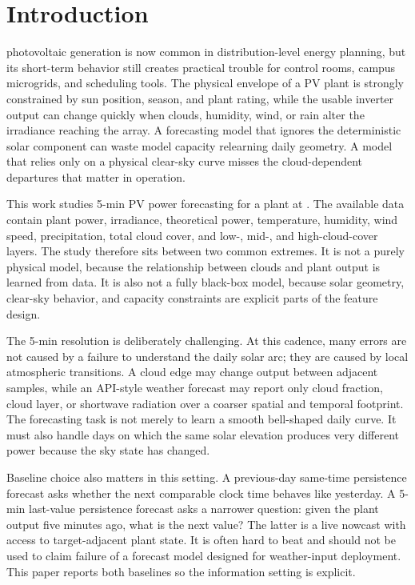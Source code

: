 \section{Introduction}
\label{sec:introduction}

 photovoltaic generation is now common in distribution-level energy planning, but its short-term behavior still creates practical trouble for control rooms, campus microgrids, and scheduling tools. The physical envelope of a PV plant is strongly constrained by sun position, season, and plant rating, while the usable inverter output can change quickly when clouds, humidity, wind, or rain alter the irradiance reaching the array. A forecasting model that ignores the deterministic solar component can waste model capacity relearning daily geometry. A model that relies only on a physical clear-sky curve misses the cloud-dependent departures that matter in operation.

This work studies 5-min PV power forecasting for a \PlantCapacity{} plant at \StudySite. The available data contain plant power, irradiance, theoretical power, temperature, humidity, wind speed, precipitation, total cloud cover, and low-, mid-, and high-cloud-cover layers. The study therefore sits between two common extremes. It is not a purely physical model, because the relationship between clouds and plant output is learned from data. It is also not a fully black-box model, because solar geometry, clear-sky behavior, and capacity constraints are explicit parts of the feature design.

The 5-min resolution is deliberately challenging. At this cadence, many errors are not caused by a failure to understand the daily solar arc; they are caused by local atmospheric transitions. A cloud edge may change output between adjacent samples, while an API-style weather forecast may report only cloud fraction, cloud layer, or shortwave radiation over a coarser spatial and temporal footprint. The forecasting task is not merely to learn a smooth bell-shaped daily curve. It must also handle days on which the same solar elevation produces very different power because the sky state has changed.

Baseline choice also matters in this setting. A previous-day same-time persistence forecast asks whether the next comparable clock time behaves like yesterday. A 5-min last-value persistence forecast asks a narrower question: given the plant output five minutes ago, what is the next value? The latter is a live nowcast with access to target-adjacent plant state. It is often hard to beat and should not be used to claim failure of a forecast model designed for weather-input deployment. This paper reports both baselines so the information setting is explicit.

